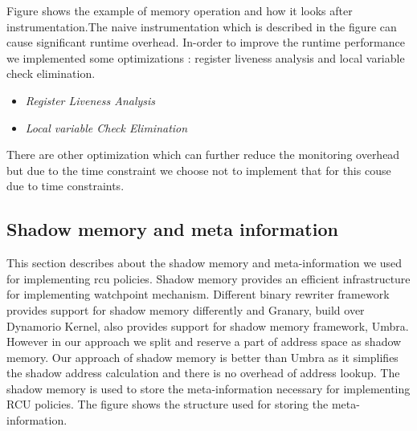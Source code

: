 Figure shows the example of memory operation and how it looks after instrumentation.The naive instrumentation which is described in the figure can cause significant runtime overhead. In-order to improve the runtime performance we implemented some optimizations : register liveness analysis and local variable check elimination. 

\begin{itemize}
\item \emph{Register Liveness Analysis}
\item \emph{Local variable Check Elimination}
\end{itemize} 

There are other optimization which can further reduce the monitoring overhead but due to the time constraint we choose not to implement that for this couse due to time constraints.


\subsection{Shadow memory and meta information}
This section describes about the shadow memory and meta-information we used for implementing rcu policies. Shadow memory provides an efficient infrastructure for implementing watchpoint mechanism. Different binary rewriter framework provides support for shadow memory differently and Granary, build over Dynamorio Kernel, also provides support for shadow memory framework, Umbra. However in our approach we split and reserve a part of address space as shadow memory. Our approach of shadow memory is better than Umbra as it simplifies the shadow address calculation and there is no overhead of address lookup. The shadow memory is used to store the meta-information necessary for implementing RCU policies. The figure shows the structure used for storing the meta-information. 

